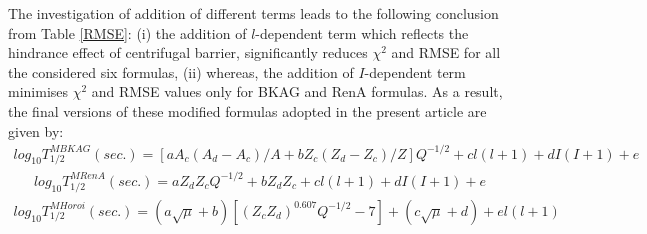 \documentclass[preprint,10pt]{elsarticle}
\begin{document}
  \begin{table}[!htbp]
\caption{The ${\chi}^2$ and RMSE of various versions of BKAG, RenA, Horoi, NRDX, UDL, and UNIV formulas for 61 cluster decay data.}
\centering
\def\arraystretch{1.0}
\resizebox{1.0\textwidth}{!}{%
{\begin{tabular}{c|ccccccccccccccccc}
 \hline
\multicolumn{1}{c|}{Formula}&
\multicolumn{2}{c}{BKAG}&
\multicolumn{1}{c}{}&
\multicolumn{2}{c}{RenA}&
\multicolumn{1}{c}{}&
 \multicolumn{2}{c}{Horoi}&
 \multicolumn{1}{c}{}&

\multicolumn{2}{c}{NRDX}&
\multicolumn{1}{c}{}&
\multicolumn{2}{c}{UDL}&
\multicolumn{1}{c}{}&
\multicolumn{2}{c}{UNIV}\\
\cline{2-3}\cline{5-6}\cline{8-9}\cline{11-12}\cline{14-15}\cline{17-18}
\multicolumn{1}{c|}{}&
\multicolumn{1}{c}{${\chi}^2$}&
\multicolumn{1}{c}{RMSE}&
\multicolumn{1}{c}{}&
\multicolumn{1}{c}{${\chi}^2$}&
\multicolumn{1}{c}{RMSE}&
\multicolumn{1}{c}{}&
\multicolumn{1}{c}{${\chi}^2$}&
\multicolumn{1}{c}{RMSE}&
\multicolumn{1}{c}{}&
\multicolumn{1}{c}{${\chi}^2$}&
\multicolumn{1}{c}{RMSE}&
\multicolumn{1}{c}{}&
\multicolumn{1}{c}{${\chi}^2$}&
\multicolumn{1}{c}{RMSE}&
\multicolumn{1}{c}{}&
\multicolumn{1}{c}{${\chi}^2$}&
\multicolumn{1}{c}{RMSE}\\
 \hline
Original             &1.01 & 0.98 && 1.10 & 0.95 && 1.45 & 1.16 &&  0.85 & 0.90 && 1.88 & 1.34 &&0.87& 0.91  \\
With $l$ term only   &0.66 & 0.78 && 0.92 & 0.93 && 0.76 & 0.84 &&  0.66 & 0.78 && 0.51 & 0.69 &&0.65& 0.78  \\
With $l$ and I terms &0.44 & 0.63 && 0.68 & 0.79 && 0.77 & 0.83 &&  0.66 & 0.77 && 0.49 & 0.67 &&0.67& 0.77  \\

\hline
\end{tabular}}}
\label{RMSE}
\end{table}
The investigation of addition of different terms leads to the following conclusion from Table \ref{RMSE}: (i) the addition of $l$-dependent term which reflects the hindrance effect of centrifugal barrier, significantly reduces ${\chi}^2$ and RMSE for all the considered six formulas, (ii) whereas, the addition of $I$-dependent term minimises ${\chi}^2$ and RMSE values only for BKAG and RenA formulas. As a result, the final versions of these modified formulas adopted in the present article are given by:
\begin{eqnarray}
 log_{10}T_{1/2}^{MBKAG}(sec.) = [aA_{c}(A_{d}-A_{c})/A + bZ_{c}(Z_{d}-Z_{c})/Z]Q^{-1/2} + cl(l+1)+ dI(I+1) + e
 \label{eqmbakg}
 \end{eqnarray}
 \begin{eqnarray}
 log_{10}T_{1/2}^{MRenA}(sec.) = aZ_{d}Z_{c}Q^{-1/2} + bZ_{d}Z_{c} + cl(l+1) + dI(I+1) + e \label{eqmrena}
 \end{eqnarray}
\begin{eqnarray}
log_{10}T_{1/2}^{MHoroi}(sec.) = (a\sqrt{\mu} + b)[(Z_{c}Z_{d})^{0.607}Q^{-1/2} - 7] + (c\sqrt{\mu} + d) + el(l+1)
\label{eqmhoroi}
\end{eqnarray}
\end{document}
